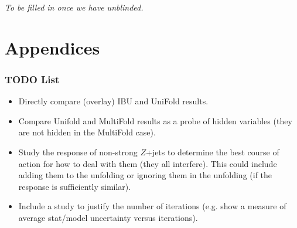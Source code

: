 \documentclass[NOTE, atlasdraft=true, texlive=2016, UKenglish]{\ATLASLATEXPATH atlasdoc}
\begin{document}
\textit{To be filled in once we have unblinded.}

\clearpage


\printbibliography
%
%

\clearpage


\clearpage
\appendix
\part*{Appendices}

\section{TODO List}
\label{sec:todo}

\begin{itemize}
\item Directly compare (overlay) IBU and UniFold results.
\item Compare Unifold and MultiFold results as a probe of hidden variables (they are not hidden in the MultiFold case).
\item Study the response of non-strong $Z$+jets to determine the best course of action for how to deal with them (they all interfere).   This could include adding them to the unfolding or ignoring them in the unfolding (if the response is sufficiently similar).
\item Include a study to justify the number of iterations (e.g. show a measure of average stat/model uncertainty versus iterations).
\end{itemize}
\end{document}

